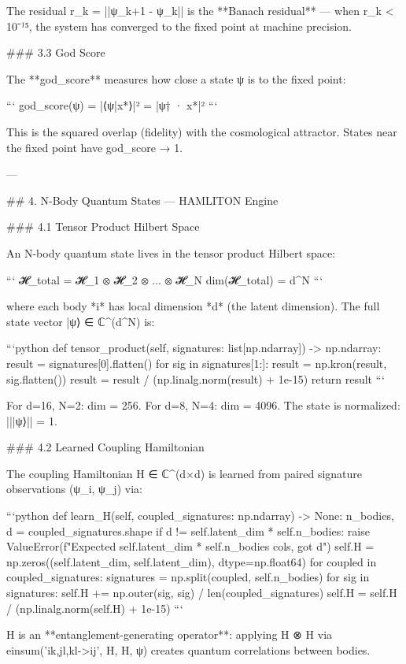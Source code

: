 The residual r_k = ||ψ_{k+1} - ψ_k|| is the **Banach residual** — when r_k < 10⁻¹⁵, the system has converged to the fixed point at machine precision.

### 3.3 God Score

The **god_score** measures how close a state ψ is to the fixed point:

```
god_score(ψ) = |⟨ψ|x*⟩|² = |ψ† · x*|²
```

This is the squared overlap (fidelity) with the cosmological attractor.  States near the fixed point have god_score → 1.

---

## 4. N-Body Quantum States — HAMLITON Engine

### 4.1 Tensor Product Hilbert Space

An N-body quantum state lives in the tensor product Hilbert space:

```
𝓗_total = 𝓗_1 ⊗ 𝓗_2 ⊗ ... ⊗ 𝓗_N
dim(𝓗_total) = d^N
```

where each body *i* has local dimension *d* (the latent dimension).  The full state vector |ψ⟩ ∈ ℂ^(d^N) is:

```python
def tensor_product(self, signatures: list[np.ndarray]) -> np.ndarray:
    result = signatures[0].flatten()
    for sig in signatures[1:]:
        result = np.kron(result, sig.flatten())
    result = result / (np.linalg.norm(result) + 1e-15)
    return result
```

For d=16, N=2: dim = 256.  For d=8, N=4: dim = 4096.  The state is normalized: |||ψ⟩|| = 1.

### 4.2 Learned Coupling Hamiltonian

The coupling Hamiltonian H ∈ ℂ^(d×d) is learned from paired signature observations {(ψ_i, ψ_j)} via:

```python
def learn_H(self, coupled_signatures: np.ndarray) -> None:
    n_bodies, d = coupled_signatures.shape
    if d != self.latent_dim * self.n_bodies:
        raise ValueError(f"Expected {self.latent_dim * self.n_bodies} cols, got {d}")
    self.H = np.zeros((self.latent_dim, self.latent_dim), dtype=np.float64)
    for coupled in coupled_signatures:
        signatures = np.split(coupled, self.n_bodies)
        for sig in signatures:
            self.H += np.outer(sig, sig) / len(coupled_signatures)
    self.H = self.H / (np.linalg.norm(self.H) + 1e-15)
```

H is an **entanglement-generating operator**: applying H ⊗ H via einsum('ik,jl,kl->ij', H, H, ψ) creates quantum correlations between bodies.

